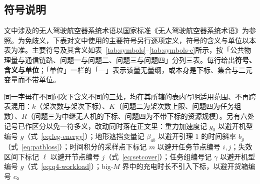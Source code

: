 \subsection{符号说明}
文中涉及的无人驾驶航空器系统术语以国家标准《无人驾驶航空器系统术语》\cite{samr2019uavterminology}为参照。为免歧义，下表对文中使用的主要符号另行逐项定义，符号的含义与单位以本表为准。主要符号及其含义如表~\ref{tab:symbols}--\ref{tab:symbols-c}所示，按「公共物理量与通信链路、问题一与问题二、问题三与问题四」分列三表。每行给出\textbf{符号、含义与单位}；「单位」一栏的「---」表示该量无量纲，或本身是下标、集合与二元变量而不带单位。

同一字母在不同问次下含义不同的三处，均在其所辖的表内写明适用范围、不再跨表混用：$k$（架次数与架次下标）、$K$（问题二为架次数上限、问题四为任务组数）、$R$（问题三为中继无人机的下标、问题四为不带下标的资源规模）。另有六处记号已作区分以免一符多义，改动同时落在正文里：重力加速度记 $g_0$ 以避开机型编号 $g$（式~\eqref{eq:leg-energy}）；地形遮挡变量记 $\beta_{ab}$ 以避开引理 1 的时间斜率 $b_g$（式~\eqref{eq:pathloss}）；时间积分的采样点下标记 $m$ 以避开任务节点编号 $i,j$；失效区间下标记 $\ell$ 以避开节点编号 $j$（式~\eqref{eq:setcover}）；任务组编号记 $\gamma$ 以避开机型编号 $g$（式~\eqref{eq:q4-workload}）；big-$M$ 界中的充电时长不引入下标，以避开货箱编号 $c$。

